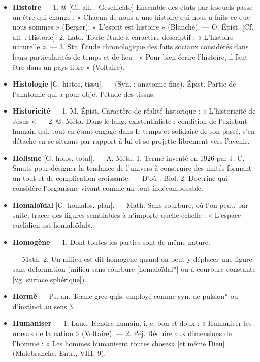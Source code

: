 \begin{itemize}[leftmargin=1cm, label=, itemsep=1pt]
\item {\bf Histoire} — 1. @ [Cf. all. : Geschichte]
Ensemble des états par lesquels
passe un être qui change : « Chacun
de nous a une histoire qui nous a
faits ce que nous sommes » (Berger);
« L'esprit est histoire » (Blanché).
— O. Épist. [Cf. all. : Historie]. 2.
Lato. Toute étude à caractère descriptif : « L'histoire naturelle ». —
3. Str. Étude chronologique des
faits sociaux considérés dans leurs
particularités de temps et de lieu :
« Pour bien écrire l’histoire, il faut
être dans un pays libre » (Voltaire).

\item {\bf Histologie} [G. histos, tissu]. — (Syn. :
anatomie fine). Épist. Partie de
l'anatomie qui a pour objet l'étude
des tissus.

\item {\bf Historicité} — 1. M. Épist. Caractère de
réalité historique : « L’historicité de
Jésus ». — 2. ©. Méta. Dans le lang.
existentialiste : condition de l’existant humain qui, tout en étant
engagé dans le temps et solidaire
de son passé, s’en détache en se
% 
situant par rapport à lui et se
projette librement vers l'avenir.

\item {\bf Holisme} [G. holos, total]. — A. Méta.
1. Terme inventé en 1926 par
J. C. Smuts pour désigner la tendance de l’univers à construire des
unités formant un tout et de complication croissante. — D'où : Biol.
2. Doctrine qui considère l’organisme vivant comme un tout indécomposable.

\item {\bf Homaloïdal} [G. homalos, plan]. —
Math. Sans courbure; où l’on peut,
par suite, tracer des figures semblables à n'importe quelle échelle :
« L'espace euclidien est homaloïdal».

\item {\bf Homogène} — 1. Dont toutes les
parties sont de même nature.

— Math. 2. Un milieu est dit
homogène quand on peut y déplacer
une figure sans déformation (milieu
sans courbure [homaloïdal*] ou
à courbure constante [vg. surface
sphérique]).

\item {\bf Hormè} — Ps. an. Terme grec qqfs.
employé comme syn. de pulsion*
ou d’instinct au sens 3.

\item {\bf Humaniser} — 1. Laud. Rendre humain,
i. e. bon et doux : « Humaniser
les mœurs de la nation » (Voltaire).
— 2. Péj. Réduire aux dimensions
de l’homme : « Les hommes humanisent toutes choses» [et même
Dieu] (Malebranche, Entr., VIII, 9).


\end{itemize}
